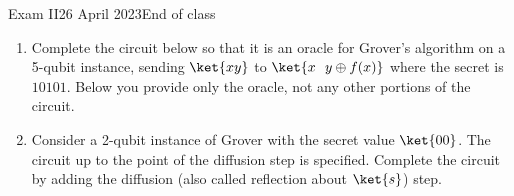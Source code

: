 \documentclass[12pt]{article}
\newcommand{\Blank}[1][1in]{\mbox{\vrule width #1 depth 2pt}\vrule width 0pt height 2.0em}
\begin{document}
\begin{assignment}{Exam II}{26 April 2023}{End of class}
\begin{enumerate}
\begin{itemize}
    What is the secret $s$ here? \Blank[2in]{}
    \item If this oracle is used in the Deutsch--Jozsa algorithm, what possible amplitude(s) can be measured on $\ket{00000000}$?
    
    \Blank[4in]{}
    \item What other computational basis vector(s), if any, will have non-zero amplitude for Deutsch--Jozsa if the above oracle is used?  
    
    \Blank[4in]{}
\end{itemize}

\clearpage\item{}
Complete the circuit below so that it is an oracle for Grover's algorithm on a 5-qubit instance, sending $\ket{xy}$ to $\ket{x\ \  y\oplus f(x)}$ where the secret is $10101$.  Below you provide only the oracle, not any other portions of the circuit.


\item{}
Consider a 2-qubit instance of Grover with the secret value $\ket{00}$.  The circuit up to the point of the diffusion step is specified.  Complete the circuit by adding the diffusion (also called reflection about $\ket{s}$) step.



\end{enumerate}
\end{assignment}
\end{document}
